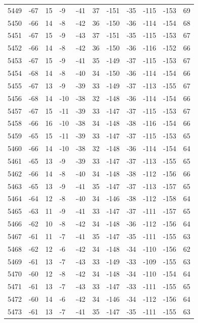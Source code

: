 \begin{table}[H]
\begin{tabular}{lllllllllll}
5449 & -67 & 15 & -9 & -41 & 37 & -151 & -35 & -115 & -153 & 69 \\
5450 & -66 & 14 & -8 & -42 & 36 & -150 & -36 & -114 & -154 & 68 \\
5451 & -67 & 15 & -9 & -43 & 37 & -151 & -35 & -115 & -153 & 67 \\
5452 & -66 & 14 & -8 & -42 & 36 & -150 & -36 & -116 & -152 & 66 \\
5453 & -67 & 15 & -9 & -41 & 35 & -149 & -37 & -115 & -153 & 67 \\
5454 & -68 & 14 & -8 & -40 & 34 & -150 & -36 & -114 & -154 & 66 \\
5455 & -67 & 13 & -9 & -39 & 33 & -149 & -37 & -113 & -155 & 67 \\
5456 & -68 & 14 & -10 & -38 & 32 & -148 & -36 & -114 & -154 & 66 \\
5457 & -67 & 15 & -11 & -39 & 33 & -147 & -37 & -115 & -153 & 67 \\
5458 & -66 & 16 & -10 & -38 & 34 & -148 & -38 & -116 & -154 & 66 \\
5459 & -65 & 15 & -11 & -39 & 33 & -147 & -37 & -115 & -153 & 65 \\
5460 & -66 & 14 & -10 & -38 & 32 & -148 & -36 & -114 & -154 & 64 \\
5461 & -65 & 13 & -9 & -39 & 33 & -147 & -37 & -113 & -155 & 65 \\
5462 & -66 & 14 & -8 & -40 & 34 & -148 & -38 & -112 & -156 & 66 \\
5463 & -65 & 13 & -9 & -41 & 35 & -147 & -37 & -113 & -157 & 65 \\
5464 & -64 & 12 & -8 & -40 & 34 & -146 & -38 & -112 & -158 & 64 \\
5465 & -63 & 11 & -9 & -41 & 33 & -147 & -37 & -111 & -157 & 65 \\
5466 & -62 & 10 & -8 & -42 & 34 & -148 & -36 & -112 & -156 & 64 \\
5467 & -61 & 11 & -7 & -41 & 35 & -147 & -35 & -111 & -155 & 63 \\
5468 & -62 & 12 & -6 & -42 & 34 & -148 & -34 & -110 & -156 & 62 \\
5469 & -61 & 13 & -7 & -43 & 33 & -149 & -33 & -109 & -155 & 63 \\
5470 & -60 & 12 & -8 & -42 & 34 & -148 & -34 & -110 & -154 & 64 \\
5471 & -61 & 13 & -7 & -43 & 33 & -147 & -33 & -111 & -155 & 65 \\
5472 & -60 & 14 & -6 & -42 & 34 & -146 & -34 & -112 & -156 & 64 \\
5473 & -61 & 13 & -7 & -41 & 35 & -147 & -35 & -111 & -155 & 63 \\

\end{tabular}
\end{table}
